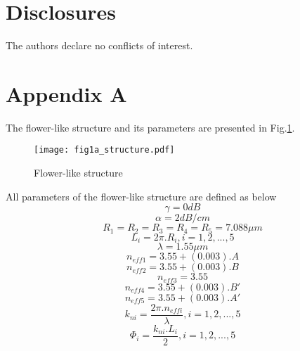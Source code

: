 \documentclass{osa-article}
\begin{document}
\section*{Disclosures}
The authors declare no conflicts of interest.

\appendix
\section*{Appendix A}
\label{Appendix A}
The flower-like structure and its parameters are presented in Fig.\ref{fig1a_structure}.
   \begin{figure}[tb]
\centering
\texttt{[image: fig1a\_structure.pdf]}
	\caption{Flower-like structure}
	\label{fig1a_structure}
\end{figure}
All parameters of the flower-like structure are defined as below\\
 \begin{equation}
\gamma=0 dB
\label{eqa1}
\end{equation}
 \begin{equation}
\alpha=2 dB/cm
\label{eqa2}
\end{equation}
 \begin{equation}
R_1=R_2=R_3=R_4=R_5=7.088 {\mu}m
\label{eqa3}
\end{equation}
 \begin{equation}
L_i=2{\pi}.{R_i}, i=1, 2,..., 5
\label{eqa4}
\end{equation}
 \begin{equation}
\lambda=1.55{\mu}m
\label{eqa5}
\end{equation}
 \begin{equation}
n_{eff1}=3.55+(0.003).A
\label{eqa6}
\end{equation}
 \begin{equation}
n_{eff2}=3.55+(0.003).B
\label{eqa7}
\end{equation}
 \begin{equation}
n_{eff3}=3.55
\label{eqa8}
\end{equation}
 \begin{equation}
n_{eff4}=3.55+(0.003). B'
\label{eqa9}
\end{equation}
 \begin{equation}
n_{eff5}=3.55+(0.003). A'
\label{eqa10}
\end{equation}
 \begin{equation}
k_{ni}=\frac{2{\pi}.n_{effi}}{\lambda}, i=1, 2, ..., 5
\label{eqa11}
\end{equation}
 \begin{equation}
\Phi_{i}=\frac{k_{ni}.L_{i}}{2}, i=1, 2, ..., 5
\label{eqa12}
\end{equation}
\end{document}
